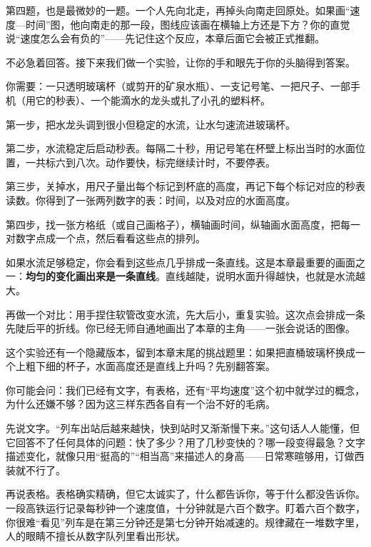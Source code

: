 第四题，也是最微妙的一题。一个人先向北走，再掉头向南走回原处。如果画“速度—时间”图，他向南走的那一段，图线应该画在横轴上方还是下方？你的直觉说“速度怎么会有负的”——先记住这个反应，本章后面它会被正式推翻。

不必急着回答。接下来我们做一个实验，让你的手和眼先于你的头脑得到答案。


\begin{experiment}
你需要：一只透明玻璃杯（或剪开的矿泉水瓶）、一支记号笔、一把尺子、一部手机（用它的秒表）、一个能滴水的龙头或扎了小孔的塑料杯。

第一步，把水龙头调到很小但稳定的水流，让水匀速流进玻璃杯。

第二步，水流稳定后启动秒表。每隔二十秒，用记号笔在杯壁上标出当时的水面位置，一共标六到八次。动作要快，标完继续计时，不要停表。

第三步，关掉水，用尺子量出每个标记到杯底的高度，再记下每个标记对应的秒表读数。你得到了一张两列数字的表：时间，以及对应的水面高度。

第四步，找一张方格纸（或自己画格子），横轴画时间，纵轴画水面高度，把每一对数字点成一个点，然后看看这些点的排列。

如果水流足够稳定，你会看到这些点几乎排成一条直线。这是本章最重要的画面之一：\textbf{均匀的变化画出来是一条直线}。直线越陡，说明水面升得越快，也就是水流越大。

再做一个对比：用手捏住软管改变水流，先大后小，重复实验。这次点会排成一条先陡后平的折线。你已经无师自通地画出了本章的主角——一张会说话的图像。
\end{experiment}

这个实验还有一个隐藏版本，留到本章末尾的挑战题里：如果把直桶玻璃杯换成一个上粗下细的杯子，水面高度还是直线上升吗？先别翻答案。


你可能会问：我们已经有文字，有表格，还有“平均速度”这个初中就学过的概念，为什么还嫌不够？因为这三样东西各自有一个治不好的毛病。

先说文字。“列车出站后越来越快，快到站时又渐渐慢下来。”这句话人人能懂，但它回答不了任何具体的问题：快了多少？用了几秒变快的？哪一段变得最急？文字描述变化，就像只用“挺高的”“相当高”来描述人的身高——日常寒暄够用，订做西装就不行了。

再说表格。表格确实精确，但它太诚实了，什么都告诉你，等于什么都没告诉你。一段高铁运行记录每秒钟一个速度值，十分钟就是六百个数字。盯着六百个数字，你很难“看见”列车是在第三分钟还是第七分钟开始减速的。规律藏在一堆数字里，人的眼睛不擅长从数字队列里看出形状。

